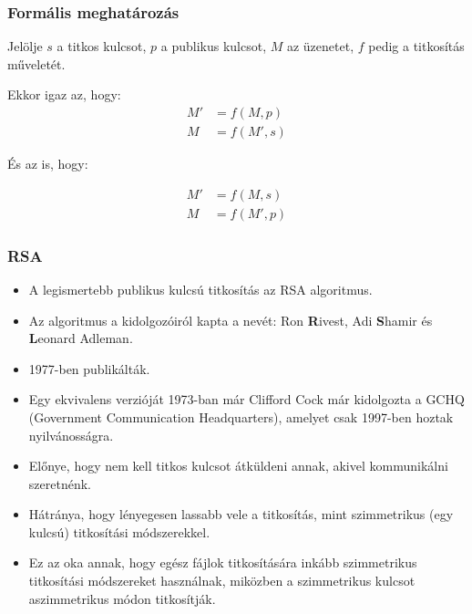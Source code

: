 \documentclass{beamer}
\begin{document}
\begin{frame}
    \frametitle{Formális meghatározás}

    Jelölje $s$ a titkos kulcsot, $p$ a publikus kulcsot, $M$ az üzenetet, $f$ pedig a titkosítás műveletét.

    Ekkor igaz az, hogy:
    \begin{align*}
        M' & = f(M, p)  \\
        M  & = f(M', s)
    \end{align*}

    És az is, hogy:

    \begin{align*}
        M' & = f(M, s)  \\
        M  & = f(M', p)
    \end{align*}
\end{frame}

\begin{frame}
    \frametitle{RSA}

    \begin{itemize}
        \item A legismertebb publikus kulcsú titkosítás az RSA algoritmus.
        \item Az algoritmus a kidolgozóiról kapta a nevét: Ron \textbf{R}ivest, Adi \textbf{S}hamir és \textbf{L}eonard Adleman.
        \item 1977-ben publikálták.
        \item Egy ekvivalens verzióját 1973-ban már Clifford Cock már kidolgozta a GCHQ (Government Communication Headquarters),
              amelyet csak 1997-ben hoztak nyilvánosságra.
        \item Előnye, hogy nem kell titkos kulcsot átküldeni annak, akivel kommunikálni szeretnénk.
        \item Hátránya, hogy lényegesen lassabb vele a titkosítás, mint szimmetrikus (egy kulcsú) titkosítási módszerekkel.
        \item Ez az oka annak, hogy egész fájlok titkosítására inkább szimmetrikus titkosítási módszereket használnak, miközben
              a szimmetrikus kulcsot aszimmetrikus módon titkosítják.
    \end{itemize}
\end{frame}
\end{document}
